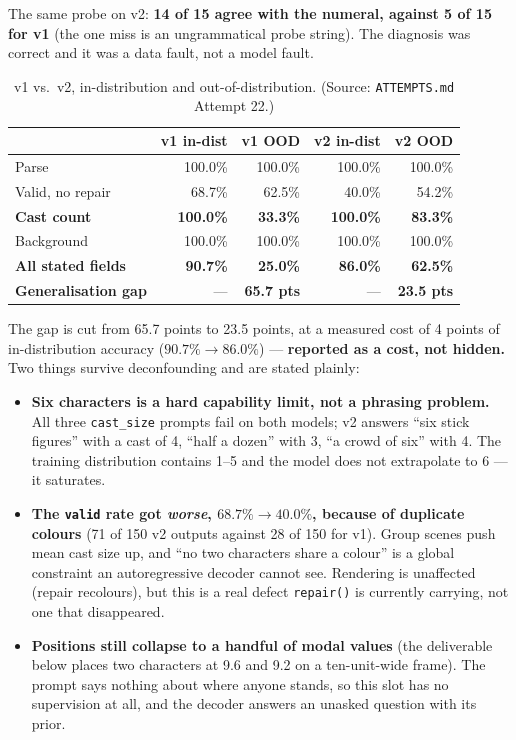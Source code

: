 \documentclass[11pt]{article}
\begin{document}
The same probe on v2: \textbf{14 of 15 agree with the numeral, against 5
of 15 for v1} (the one miss is an ungrammatical probe string). The
diagnosis was correct and it was a data fault, not a model fault.

\begin{table}[h]
\centering
\caption{v1 vs.\ v2, in-distribution and out-of-distribution.
(Source: \texttt{ATTEMPTS.md} Attempt 22.)}
\label{tab:v1v2gap}
\begin{tabular}{@{}lrrrr@{}}
\toprule
 & v1 in-dist & v1 OOD & v2 in-dist & v2 OOD \\
\midrule
Parse & 100.0\% & 100.0\% & 100.0\% & 100.0\% \\
Valid, no repair & 68.7\% & 62.5\% & 40.0\% & 54.2\% \\
\textbf{Cast count} & \textbf{100.0\%} & \textbf{33.3\%} & \textbf{100.0\%} & \textbf{83.3\%} \\
Background & 100.0\% & 100.0\% & 100.0\% & 100.0\% \\
\textbf{All stated fields} & \textbf{90.7\%} & \textbf{25.0\%} & \textbf{86.0\%} & \textbf{62.5\%} \\
\textbf{Generalisation gap} & --- & \textbf{65.7 pts} & --- & \textbf{23.5 pts} \\
\bottomrule
\end{tabular}
\end{table}

The gap is cut from 65.7 points to 23.5 points, at a measured cost of 4
points of in-distribution accuracy ($90.7\% \rightarrow 86.0\%$) ---
\textbf{reported as a cost, not hidden.} Two things survive deconfounding
and are stated plainly:

\begin{itemize}
\item \textbf{Six characters is a hard capability limit, not a phrasing
  problem.} All three \texttt{cast\_size} prompts fail on both models; v2
  answers ``six stick figures'' with a cast of 4, ``half a dozen'' with
  3, ``a crowd of six'' with 4. The training distribution contains 1--5
  and the model does not extrapolate to 6 --- it saturates.
\item \textbf{The \texttt{valid} rate got \emph{worse}, $68.7\%
  \rightarrow 40.0\%$, because of duplicate colours} (71 of 150 v2
  outputs against 28 of 150 for v1). Group scenes push mean cast size up,
  and ``no two characters share a colour'' is a global constraint an
  autoregressive decoder cannot see. Rendering is unaffected (repair
  recolours), but this is a real defect \texttt{repair()} is currently
  carrying, not one that disappeared.
\item \textbf{Positions still collapse to a handful of modal values} (the
  deliverable below places two characters at 9.6 and 9.2 on a
  ten-unit-wide frame). The prompt says nothing about where anyone
  stands, so this slot has no supervision at all, and the decoder answers
  an unasked question with its prior.
\end{itemize}
\end{document}
